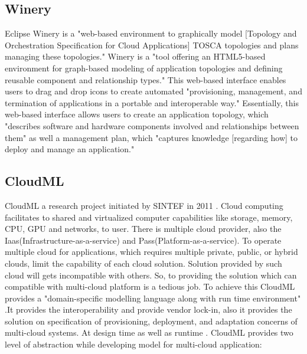 \subsection{Winery}

     Eclipse Winery \cite{www-winery} is a "web-based environment to 
     graphically model [Topology and Orchestration Specification for 
     Cloud Applications] TOSCA topologies and plans managing these 
     topologies." Winery \cite{winery-paper-2013} is a "tool 
     offering an HTML5-based environment for graph-based modeling of 
     application topologies and defining reusable component and 
     relationship types." This web-based \cite{winery-paper-2013} 
     interface enables users to drag and drop icons to create 
     automated "provisioning, management, and termination of 
     applications in a portable and interoperable way." 
     Essentially, this web-based interface \cite{winery-paper-2013} 
     allows users to create an application topology, which 
     "describes software and hardware components involved and 
     relationships between them" as well a management plan, which 
     "captures knowledge [regarding how] to deploy and manage an 
     application."

\subsection{CloudML}
                                                            
     CloudML a research project initiated by SINTEF in 2011
     \cite{www-cloudml}. Cloud computing facilitates to shared
     and virtualized computer capabilities like storage, memory,
     CPU, GPU and networks, to user. There is multiple cloud provider,
     also the Iaas(Infrastructure-as-a-service) and
     Pass(Platform-as-a-service). To operate multiple cloud for
     applications, which requires multiple private, public, or hybrid
     clouds, limit the capability of each cloud solution.  Solution
     provided by such cloud will gets incompatible with others. So,
     to providing the solution which can compatible with multi-cloud
     platform is a tedious job. To achieve this CloudML provides a
     "domain-specific modelling language along with run time environment"
     \cite{www-cloudml}.It provides the interoperability and provide
     vendor lock-in, also it provides the solution on specification of
     provisioning, deployment, and adaptation concerns of multi-cloud
     systems. At design time as well as runtime \cite{www-cloudml}.
     CloudML provides two level of abstraction while developing model
     for multi-cloud application:

